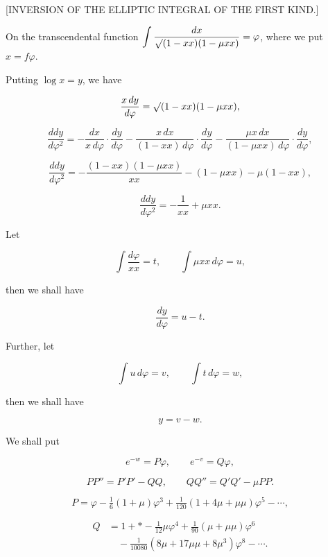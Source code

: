\clearpage
{}%

\begin{center}
\large [INVERSION OF THE ELLIPTIC INTEGRAL OF THE FIRST KIND.]
\end{center}

\bigskip

\noindent\hspace*{\parindent}On the transcendental function $\displaystyle\int\frac{dx}{\mathord{\surd}(1-xx)(1-\mu xx)}=\varphi$, where we put \mbox{$x=f\varphi$}.

Putting $\log x = y$, we have

\[ \frac{x\,dy}{d\varphi} = \mathord{\surd}(1-xx)(1-\mu xx), \]

\[ \frac{ddy}{d\varphi^2} = -\frac{dx}{x\,d\varphi}\cdot\frac{dy}{d\varphi} - \frac{x\,dx}{(1-xx)\,d\varphi}\cdot\frac{dy}{d\varphi} - \frac{\mu x\,dx}{(1-\mu xx)\,d\varphi}\cdot\frac{dy}{d\varphi}, \]

\[ \frac{ddy}{d\varphi^2} = -\frac{(1-xx)(1-\mu xx)}{xx} - (1-\mu xx) - \mu(1-xx), \]

\[ \frac{ddy}{d\varphi^2} = -\frac{1}{xx} + \mu xx. \]

\noindent Let

\[ \int\frac{d\varphi}{xx} = t, \qquad \int \mu xx\,d\varphi = u, \]

\noindent then we shall have

\[ \frac{dy}{d\varphi} = u - t. \]

\noindent Further, let

\[ \int u\,d\varphi = v, \qquad \int t\,d\varphi = w, \]

\noindent then we shall have

\[ y = v - w. \]

\noindent We shall put

\[ e^{-w} = P\varphi, \qquad e^{-v} = Q\varphi, \]

\[ PP'' = P'P' - QQ, \qquad QQ'' = Q'Q' - \mu PP. \]

\[ P = \varphi - \tfrac{1}{6}(1+\mu)\varphi^3 + \tfrac{1}{120}(1+4\mu+\mu\mu)\varphi^5 - \cdots, \]

\[\begin{aligned} Q &= 1+\ast-\tfrac{1}{12}\mu\varphi^4+\tfrac{1}{90}(\mu+\mu\mu)\varphi^6\\&\quad-\tfrac{1}{10080}(8\mu+17\mu\mu+8\mu^3)\varphi^8-\cdots.\end{aligned}\]

\bigskip


